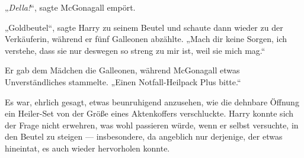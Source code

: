 „\emph{Della!}“, sagte McGonagall empört.

„Goldbeutel“, sagte Harry zu seinem Beutel und schaute dann wieder zu der Verkäuferin, während er fünf Galleonen abzählte.
„Mach dir keine Sorgen, ich verstehe, dass sie nur deswegen so streng zu mir ist, weil sie mich mag.“

Er gab dem Mädchen die Galleonen, während McGonagall etwas Unverständliches stammelte.
„Einen Notfall-Heilpack Plus bitte.“

Es war, ehrlich gesagt, etwas beunruhigend anzusehen, wie die dehnbare Öffnung ein Heiler-Set von der Größe eines Aktenkoffers verschluckte. Harry konnte sich der Frage nicht erwehren, was wohl passieren würde, wenn er selbst versuchte, in den Beutel zu steigen — insbesondere, da angeblich nur derjenige, der etwas hineintat, es auch wieder hervorholen konnte.

